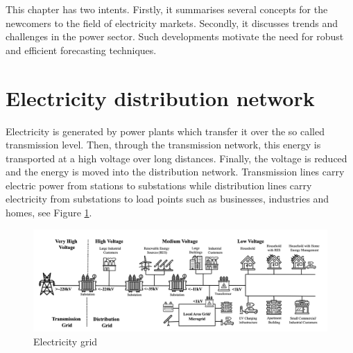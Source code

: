 
This chapter has two intents. Firstly, it summarises several concepts for the newcomers to the field of electricity markets. Secondly, it discusses trends and challenges in the power sector. Such developments motivate the need for robust and efficient forecasting techniques.


\section{Electricity distribution network}
Electricity is generated by power plants which transfer it over the so called transmission level. Then, through the transmission network, this energy is transported at a high voltage over long distances. Finally, the voltage is reduced and the energy is moved into the distribution network. Transmission lines carry electric power from stations to substations while distribution lines carry electricity from substations to load points such as businesses, industries and homes, see Figure \ref{electricity_network}.

\begin{figure}[!h]
    \includegraphics[width=\textwidth]{images/electricity_network.png}
    \caption{Electricity grid \cite{haben2021review}}
    \label{electricity_network}
\end{figure}


